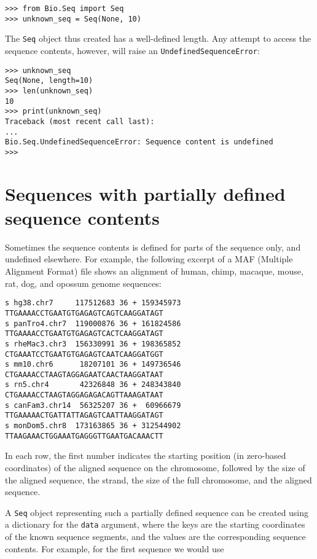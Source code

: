 \begin{verbatim}
>>> from Bio.Seq import Seq
>>> unknown_seq = Seq(None, 10)
\end{verbatim}

The \verb|Seq| object thus created has a well-defined length. Any attempt to access the sequence contents, however, will raise an \verb|UndefinedSequenceError|:

\begin{verbatim}
>>> unknown_seq
Seq(None, length=10)
>>> len(unknown_seq)
10
>>> print(unknown_seq)
Traceback (most recent call last):
...
Bio.Seq.UndefinedSequenceError: Sequence content is undefined
>>>
\end{verbatim}

\section{Sequences with partially defined sequence contents}

Sometimes the sequence contents is defined for parts of the sequence only, and undefined elsewhere. For example, the following excerpt of a MAF (Multiple Alignment Format) file shows an alignment of human, chimp, macaque, mouse, rat, dog, and opossum  genome sequences:

\begin{verbatim}
s hg38.chr7     117512683 36 + 159345973 TTGAAAACCTGAATGTGAGAGTCAGTCAAGGATAGT
s panTro4.chr7  119000876 36 + 161824586 TTGAAAACCTGAATGTGAGAGTCACTCAAGGATAGT
s rheMac3.chr3  156330991 36 + 198365852 CTGAAATCCTGAATGTGAGAGTCAATCAAGGATGGT
s mm10.chr6      18207101 36 + 149736546 CTGAAAACCTAAGTAGGAGAATCAACTAAGGATAAT
s rn5.chr4       42326848 36 + 248343840 CTGAAAACCTAAGTAGGAGAGACAGTTAAAGATAAT
s canFam3.chr14  56325207 36 +  60966679 TTGAAAAACTGATTATTAGAGTCAATTAAGGATAGT
s monDom5.chr8  173163865 36 + 312544902 TTAAGAAACTGGAAATGAGGGTTGAATGACAAACTT
\end{verbatim}

In each row, the first number indicates the starting position (in zero-based coordinates) of the aligned sequence on the chromosome, followed by the size of the aligned sequence, the strand, the size of the full chromosome, and the aligned sequence.

A \verb+Seq+ object representing such a partially defined sequence can be created using a dictionary for the \verb+data+ argument, where the keys are the starting coordinates of the known sequence segments, and the values are the corresponding sequence contents. For example, for the first sequence we would use

